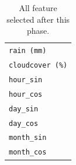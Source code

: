 \begin{table}[H]
\begin{center}
\begin{tabular}[c]{l}
			\verb|rain (mm)|                    \\
			\verb|cloudcover (%)|               \\
			\verb|hour_sin|                     \\
			\verb|hour_cos|                     \\
			\verb|day_sin|                      \\
			\verb|day_cos|                      \\
			\verb|month_sin|                    \\
			\verb|month_cos|
		\end{tabular}
	\end{center}
	\caption{All feature selected after this phase.}\label{tab:featselected}
\end{table}


